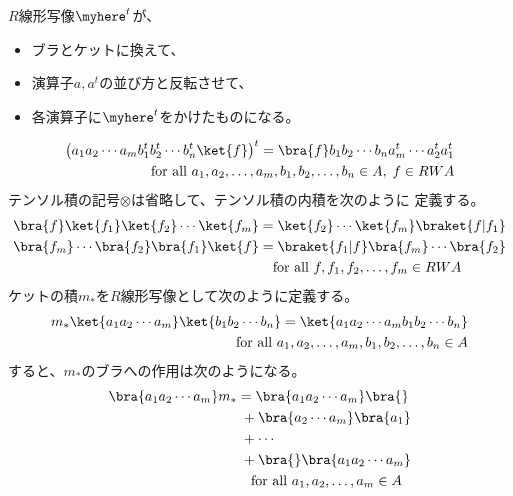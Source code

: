 		$R$線形写像$\myhere^t$が、
		\begin{itemize}\setlength{\itemsep}{-1mm} %
			\item ブラとケットに換えて、
			\item 演算子$a,a^t$の並び方と反転させて、
			\item 各演算子に$\myhere^t$をかけたものになる。
		\end{itemize} %
		\begin{equation*}\begin{split} %
			\bigl(a_1a_2\cdots a_mb_1^t b_2^t \cdots b_n^t \ket{f}\bigr)^t 
			 = \bra{f}b_1b_2\cdots b_na_m^t\cdots a_2^t a_1^t \\
			\quad\text{for all }a_1,a_2,\dots,a_m,b_1,b_2,\dots,b_n\in A
			,\; f\in RWA
		\end{split}\end{equation*} %
		テンソル積の記号$\otimes$は省略して、テンソル積の内積を次のように
		定義する。
		\begin{equation*}\begin{split} %
			\bra{f}\ket{f_1}\ket{f_2}\cdots\ket{f_m}
			&= \ket{f_2}\cdots\ket{f_m}\braket{f|f_1} \\
			\bra{f_m}\cdots\bra{f_2}\bra{f_1}\ket{f}
			&= \braket{f_1|f}\bra{f_m}\cdots\bra{f_2} \\
			&\quad\text{for all }f,f_1,f_2,\dots,f_m\in RWA
		\end{split}\end{equation*} %
		ケットの積$m_*$を$R$線形写像として次のように定義する。
		\begin{equation*}\begin{split} %
			m_*\ket{a_1a_2\cdots a_m}\ket{b_1b_2\cdots b_n}
			= \ket{a_1a_2\cdots a_mb_1b_2\cdots b_n} \\
			\quad\text{for all }a_1,a_2,\dots,a_m,b_1,b_2,\dots,b_n\in A
		\end{split}\end{equation*} %
		すると、$m_*$のブラへの作用は次のようになる。
		\begin{equation*}\begin{split} %
			\bra{a_1a_2\cdots a_m}m_*
			&= \bra{a_1a_2\cdots a_m}\bra{} \\
			&\;+ \bra{a_2\cdots a_m}\bra{a_1} \\
			&\;+ \cdots \\
			&\;+ \bra{}\bra{a_1a_2\cdots a_m} \\
			&\quad\text{for all }a_1,a_2,\dots,a_m\in A
		\end{split}\end{equation*} %
